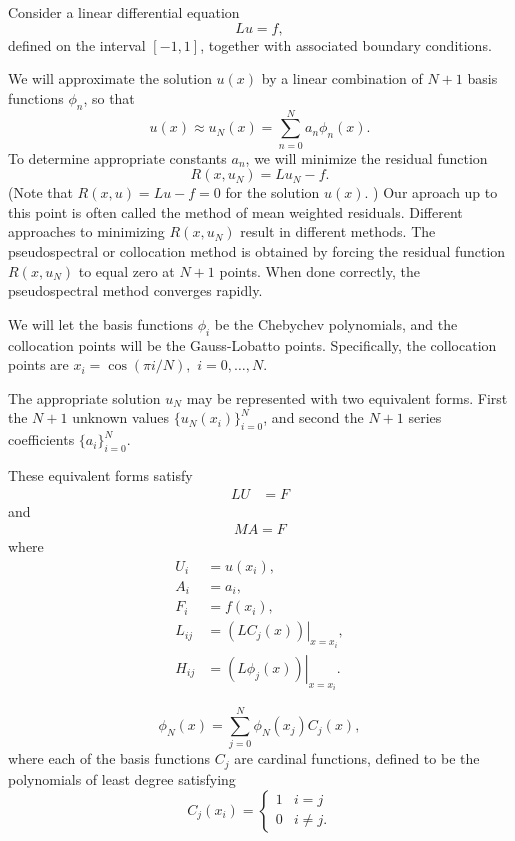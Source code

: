 \label{lab:pseudospectral1_revision}

Consider a linear differential equation 
\[Lu = f, \]
defined on the interval $[-1,1]$, together with associated boundary conditions. 

We will approximate the solution $u(x)$ by a linear combination of $N+1$ basis functions $\phi_n$, so that 
\[
u(x) \approx u_N(x) = \sum_{n=0}^N a_n \phi_n(x). 
\]
To determine appropriate constants $a_n$, we will minimize the residual function 
\[
R(x,u_N) = Lu_N - f.
\]
(Note that $R(x,u) = Lu - f = 0$ for the solution $u(x)$. ) 
Our aproach up to this point is often called the method of mean weighted residuals. 
Different approaches to minimizing $R(x,u_N)$ result in different methods. 
The pseudospectral or collocation method is obtained by forcing the residual function $R(x,u_N)$ to equal zero at $N+1$ points. 
When done correctly, the pseudospectral method converges rapidly. 

We will let the basis functions $\phi_i$ be the Chebychev polynomials, and the collocation points will be the Gauss-Lobatto points. 
Specifically, the collocation points are $x_i = \cos(\pi i /N),$ $ i = 0, \ldots, N$.


The appropriate solution $u_N$ may be represented with two equivalent forms. 
First the $N+1$ unknown values $\{u_N(x_i)\}_{i=0}^N$, and second the $N+1$ series coefficients $\{a_i\}_{i=0}^N$. 

These equivalent forms satisfy
\begin{align}
	LU &= F \label{spectral1b:grid_point}
\end{align}
and 
\begin{align}
	MA = F
\end{align}
where 
\begin{align*}
	U_i &= u(x_i),\\
	A_i &= a_i,\\
	F_i &= f(x_i),\\
	L_{ij} &= \left.(LC_j(x))\right|_{x=x_i},\\
	H_{ij} &= \left.(L\phi_j(x))\right|_{x=x_i}.
\end{align*}


\[\phi_N(x) = \sum_{j=0}^N \phi_N(x_j)C_j(x),\]
where each of the basis functions $C_j$ are cardinal functions, defined to be the polynomials of least degree satisfying
\begin{equation*}
C_j(x_i) = \begin{cases} 1 & i=j \\ 0 & i \not = j.
   \end{cases}
\end{equation*}



